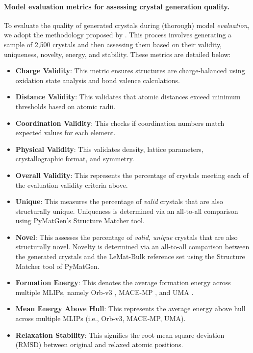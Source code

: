 \documentclass{article}
\theoremstyle{plain}
\theoremstyle{definition}
\theoremstyle{remark}
\begin{document}
\paragraph{Model evaluation metrics for assessing crystal generation quality.}
To evaluate the quality of generated crystals during (thorough) model \textit{evaluation}, we adopt the methodology proposed by \citet{duval2025lemat}. This process involves generating a sample of 2,500 crystals and then assessing them based on their validity, uniqueness, novelty, energy, and stability. These metrics are detailed below:
\begin{itemize}
    \item \textbf{Charge Validity}: This metric ensures structures are charge-balanced using oxidation state analysis and bond valence calculations.
    \item \textbf{Distance Validity}: This validates that atomic distances exceed minimum thresholds based on atomic radii.
    \item \textbf{Coordination Validity}: This checks if coordination numbers match expected values for each element.
    \item \textbf{Physical Validity}: This validates density, lattice parameters, crystallographic format, and symmetry.
    \item \textbf{Overall Validity}: This represents the percentage of crystals meeting each of the evaluation validity criteria above.
    \item \textbf{Unique}: This measures the percentage of \textit{valid} crystals that are also structurally unique. Uniqueness is determined via an all-to-all comparison using PyMatGen's Structure Matcher tool.
    \item \textbf{Novel}: This assesses the percentage of \textit{valid}, \textit{unique} crystals that are also structurally novel. Novelty is determined via an all-to-all comparison between the generated crystals and the LeMat-Bulk reference set \citep{siron2025lemat} using the Structure Matcher tool of PyMatGen.
    \item \textbf{Formation Energy}: This denotes the average formation energy across multiple MLIPs, namely Orb-v3 \citep{rhodes2025orb}, MACE-MP \citep{Batatia2025Foundation}, and UMA \citep{wood2025uma}.
    \item \textbf{Mean Energy Above Hull}: This represents the average energy above hull across multiple MLIPs (i.e., Orb-v3, MACE-MP, UMA).
    \item \textbf{Relaxation Stability}: This signifies the root mean square deviation (RMSD) between original and relaxed atomic positions.

\end{itemize}
\end{document}
